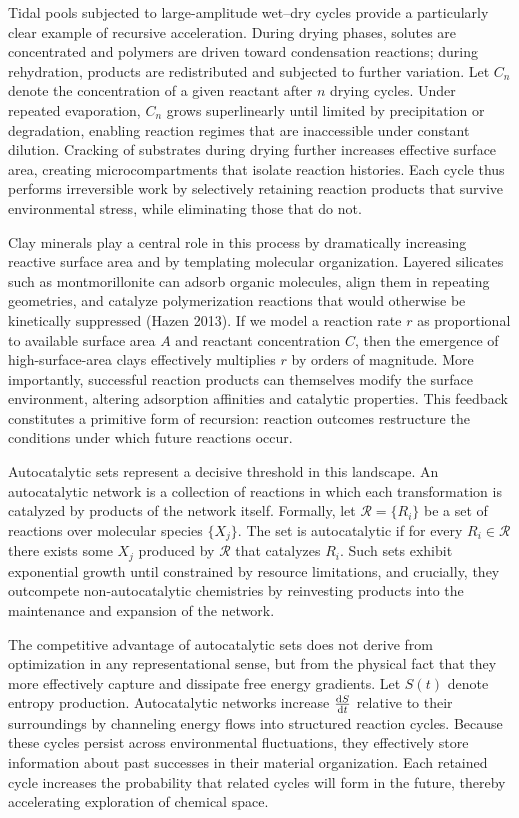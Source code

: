 \documentclass[11pt]{article}
\begin{document}
Tidal pools subjected to large-amplitude wet--dry cycles provide a particularly clear example of recursive acceleration. During drying phases, solutes are concentrated and polymers are driven toward condensation reactions; during rehydration, products are redistributed and subjected to further variation. Let $C_n$ denote the concentration of a given reactant after $n$ drying cycles. Under repeated evaporation, $C_n$ grows superlinearly until limited by precipitation or degradation, enabling reaction regimes that are inaccessible under constant dilution. Cracking of substrates during drying further increases effective surface area, creating microcompartments that isolate reaction histories. Each cycle thus performs irreversible work by selectively retaining reaction products that survive environmental stress, while eliminating those that do not.

Clay minerals play a central role in this process by dramatically increasing reactive surface area and by templating molecular organization. Layered silicates such as montmorillonite can adsorb organic molecules, align them in repeating geometries, and catalyze polymerization reactions that would otherwise be kinetically suppressed (Hazen 2013). If we model a reaction rate $r$ as proportional to available surface area $A$ and reactant concentration $C$, then the emergence of high-surface-area clays effectively multiplies $r$ by orders of magnitude. More importantly, successful reaction products can themselves modify the surface environment, altering adsorption affinities and catalytic properties. This feedback constitutes a primitive form of recursion: reaction outcomes restructure the conditions under which future reactions occur.

Autocatalytic sets represent a decisive threshold in this landscape. An autocatalytic network is a collection of reactions in which each transformation is catalyzed by products of the network itself. Formally, let $\mathcal{R} = \{R_i\}$ be a set of reactions over molecular species $\{X_j\}$. The set is autocatalytic if for every $R_i \in \mathcal{R}$ there exists some $X_j$ produced by $\mathcal{R}$ that catalyzes $R_i$. Such sets exhibit exponential growth until constrained by resource limitations, and crucially, they outcompete non-autocatalytic chemistries by reinvesting products into the maintenance and expansion of the network.

The competitive advantage of autocatalytic sets does not derive from optimization in any representational sense, but from the physical fact that they more effectively capture and dissipate free energy gradients. Let $S(t)$ denote entropy production. Autocatalytic networks increase $\dv{S}{t}$ relative to their surroundings by channeling energy flows into structured reaction cycles. Because these cycles persist across environmental fluctuations, they effectively store information about past successes in their material organization. Each retained cycle increases the probability that related cycles will form in the future, thereby accelerating exploration of chemical space.
\end{document}
